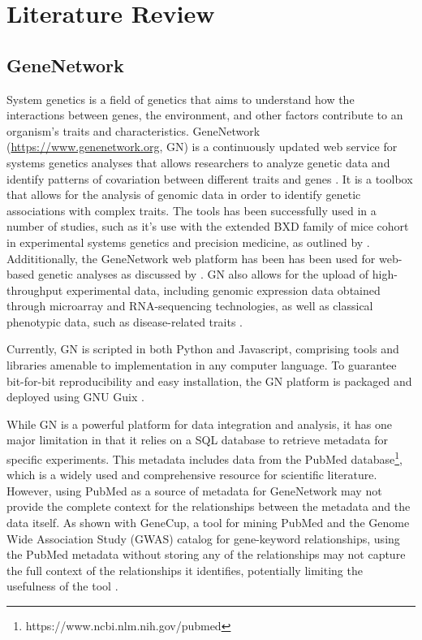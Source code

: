 \chapter{Literature Review}

\section{GeneNetwork}
System genetics is a field of genetics that aims to understand how the interactions between genes, the environment, and other factors contribute to an organism's traits and characteristics.  GeneNetwork (\url{https://www.genenetwork.org}, GN) is a continuously updated web service for systems genetics analyses that allows researchers to analyze genetic data and identify patterns of covariation between different traits and genes \citep{mulligan2017genenetwork}.  It is a toolbox that allows for the analysis of genomic data in order to identify genetic associations with complex traits.  The tools has been successfully used in a number of studies, such as it's use with the extended BXD family of mice cohort in experimental systems genetics and precision medicine, as outlined by \citep{Ashbrook:2019}.  Addititionally, the GeneNetwork web platform has been has been used for web-based genetic analyses as discussed by \citep{sloan2016genenetwork}.  GN also allows for the upload of high-throughput experimental data, including genomic expression data obtained through microarray and RNA-sequencing technologies, as well as classical phenotypic data, such as disease-related traits \citep{Anderson:2021}.

Currently, GN is scripted in both Python and Javascript, comprising tools and libraries amenable to implementation in any computer language.  To guarantee bit-for-bit reproducibility and easy installation, the GN platform is packaged and deployed using GNU Guix \citep{sloan2016genenetwork}.

While GN is a powerful platform for data integration and analysis, it has one major limitation in that it relies on a SQL database to retrieve metadata for specific experiments.  This metadata includes data from the PubMed database\footnote{https://www.ncbi.nlm.nih.gov/pubmed}, which is a widely used and comprehensive resource for scientific literature.  However, using PubMed  as a source of metadata for GeneNetwork may not provide the complete context for the relationships between the metadata and the data itself.  As shown with GeneCup, a tool for mining PubMed and the Genome Wide Association Study (GWAS) catalog for gene-keyword relationships, using the PubMed metadata without storing any of the relationships may not capture the full context of the relationships it identifies, potentially limiting the usefulness of the tool \citep{gunturkun2022genecup}.

